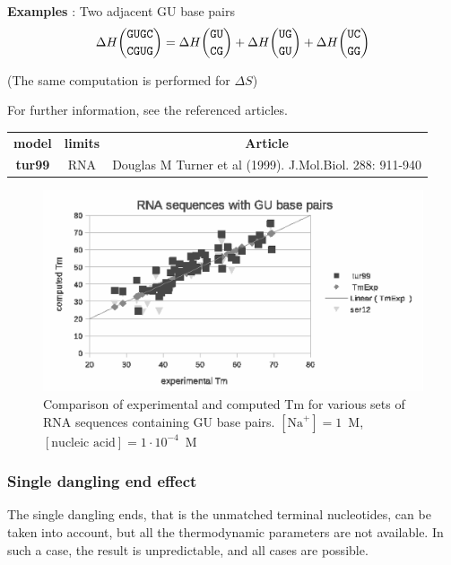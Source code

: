 \documentclass{article}
\begin{document}
\textbf{Examples} : Two adjacent GU base pairs
\begin{multline*}
\Delta H {\mbox{\texttt{GUGC}} \choose \mbox{\texttt{CGUG}}} = 
\Delta H {\mbox{\texttt{GU}} \choose \mbox{\texttt{CG}}} +
\Delta H {\mbox{\texttt{UG}} \choose \mbox{\texttt{GU}}} +
\Delta H {\mbox{\texttt{UC}} \choose \mbox{\texttt{GG}}}\\
\end{multline*}

       (The same computation is performed for $\Delta S$) 

       
For further information, see the referenced articles.

\begin{table}[h]
\begin{tabular}[h]{| c | c | c |}
\textbf{model} & \textbf{limits} & \textbf{Article} \\
\textbf{tur99} & RNA & Douglas M Turner et al (1999). J.Mol.Biol.  288: 911-940 \\
\end{tabular}
\end{table}

\begin{figure}[h]
\includegraphics{images/GUBasePairs.eps}
\caption{Comparison of experimental and computed Tm for various sets of
 RNA sequences containing GU base pairs. $[\mbox{Na}^+] = 1$~M, $[\mbox{nucleic acid}] = 1\cdot{}10^{-4}$~M}
\end{figure}

\subsubsection{Single dangling end effect}

The single dangling ends, that is the unmatched terminal nucleotides, can be taken into
account, but all the thermodynamic parameters are not available. In such a case, 
the result is unpredictable, and all cases are possible. 
\end{document}
